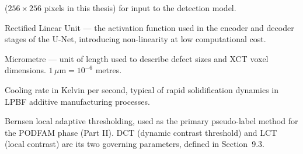 \begin{description}[leftmargin=2.6cm, style=nextline]
  ($256 \times 256$ pixels in this thesis) for input to the detection model.
\item[ReLU] Rectified Linear Unit --- the activation function used in the encoder and decoder stages
  of the U-Net, introducing non-linearity at low computational cost.
\item[$\mu$m] Micrometre --- unit of length used to describe defect sizes and XCT voxel dimensions.
  $1\,\mu\text{m} = 10^{-6}$ metres.
\item[$10^6$ K/s] Cooling rate in Kelvin per second, typical of rapid solidification dynamics in LPBF
  additive manufacturing processes.
\item[Bernsen / DCT / LCT] Bernsen local adaptive thresholding, used as the primary pseudo-label
  method for the PODFAM phase (Part II). DCT (dynamic contrast threshold) and LCT (local contrast)
  are its two governing parameters, defined in Section~9.3.
\end{description}

